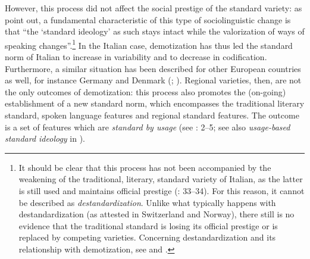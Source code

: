 However, this process did not affect the social prestige of the standard variety: as \citet[28]{CouplandKristiansen2011} point out, a fundamental characteristic of this type of sociolinguistic change is that “the ‘standard ideology’ as such stays intact while the valorization of ways of speaking changes”.\footnote{It should be clear that this process has not been accompanied by the weakening of the traditional, literary, standard variety of Italian, as the latter is still used and maintains official prestige (\citealt{Berruto2017}: 33–34). For this reason, it cannot be described as \textit{destandardization}. Unlike what typically happens with destandardization (as attested in Switzerland and Norway), there still is no evidence that the traditional standard is losing its official prestige or is replaced by competing varieties. Concerning destandardization and its relationship with demotization, see \citet{AuerSpiekermann2011} and \citet{CouplandKristiansen2011}.} In the Italian case, demotization has thus led the standard norm of Italian to increase in variability and to decrease in codification. Furthermore, a similar situation has been described for other European countries as well, for instance Germany and Denmark (\citealt{KristiansenCoupland2011}; \citealt{KristiansenGrondelaers2013}). Regional varieties, then, are not the only outcomes of demotization: this process also promotes the (on-going) establishment of a new standard norm, which encompasses the traditional literary standard, spoken language features and regional standard features. The outcome is a set of features which are \textit{standard by usage} (see \citealt{Ammon2003}: 2–5; see also \textit{usage-based standard ideology} in \citealt{AuerSpiekermann2011}).

